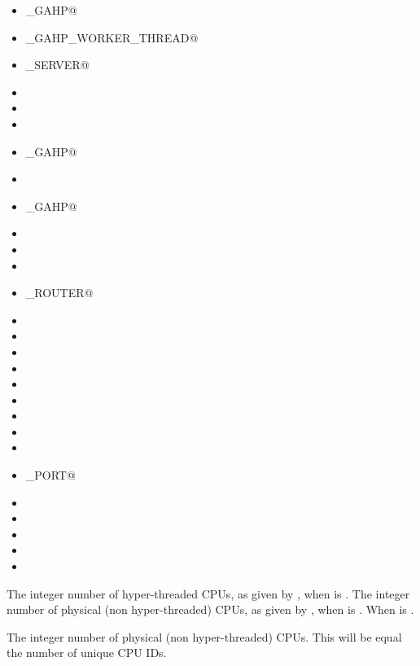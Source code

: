 \begin{description}
  \begin{itemize}
  \label{list:subsystem names}
  \item \verb@C_GAHP@
  \item \verb@C_GAHP_WORKER_THREAD@
  \item \verb@CKPT_SERVER@
  \item \verb@COLLECTOR@
  \item \verb@DBMSD@
  \item \verb@DEFRAG@
  \item {}_GAHP@
  \item \verb@GANGLIAD@
  \item \verb@GCE_GAHP@
  \item \verb@GRIDMANAGER@
  \item \verb@HAD@
  \item \verb@HDFS@
  \item \verb@JOB_ROUTER@
  \item \verb@KBDD@ 
  \item \verb@LEASEMANAGER@
  \item \verb@MASTER@
  \item \verb@NEGOTIATOR@
  \item \verb@QUILL@
  \item \verb@REPLICATION@
  \item \verb@ROOSTER@
  \item \verb@SCHEDD@
  \item \verb@SHADOW@
  \item \verb@SHARED_PORT@
  \item \verb@STARTD@
  \item \verb@STARTER@
  \item \verb@SUBMIT@
  \item \verb@TOOL@
  \item \verb@TRANSFERER@
  \end{itemize}

\label{param:DetectedCpus}
\item[\MacroU{DETECTED\_CPUS}]
  The integer number of hyper-threaded CPUs, as given by
  , when 
  is .
  The integer number of physical (non hyper-threaded) CPUs, as given by
  , when 
  is .
  When 
  is .

\label{param:DetectedPhysicalCpus}
\item[\MacroU{DETECTED\_PHYSICAL\_CPUS}]
  The integer number of physical (non hyper-threaded) CPUs.
  This will be equal the number of unique CPU IDs.

\end{description}

